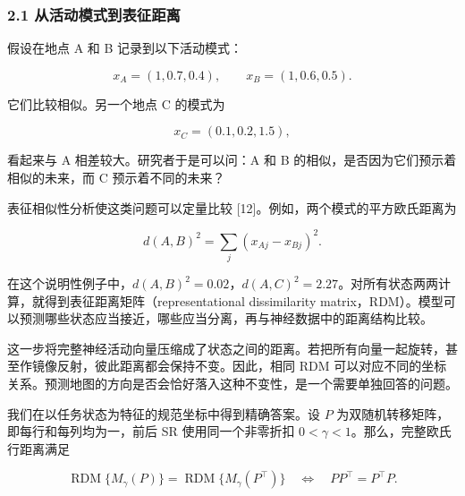 \documentclass[11pt,a4paper]{article}
\begin{document}
\subsubsection{2.1
从活动模式到表征距离}\label{ux4eceux6d3bux52a8ux6a21ux5f0fux5230ux8868ux5f81ux8dddux79bb}

\par
\noindent\begin{minipage}{\linewidth}

假设在地点 A 和 B 记录到以下活动模式：

\[
x_A=(1,0.7,0.4),\qquad x_B=(1,0.6,0.5).
\]

\end{minipage}\par

\par
\noindent\begin{minipage}{\linewidth}

它们比较相似。另一个地点 C 的模式为

\[
x_C=(0.1,0.2,1.5),
\]

\end{minipage}\par

看起来与 A 相差较大。研究者于是可以问：A 和 B
的相似，是否因为它们预示着相似的未来，而 C 预示着不同的未来？

\par
\noindent\begin{minipage}{\linewidth}

表征相似性分析使这类问题可以定量比较
{[}12{]}。例如，两个模式的平方欧氏距离为

\[
d(A,B)^2=\sum_j(x_{Aj}-x_{Bj})^2.
\]

\end{minipage}\par

在这个说明性例子中，\(d(A,B)^2=0.02\)，\(d(A,C)^2=2.27\)。对所有状态两两计算，就得到表征距离矩阵（representational
dissimilarity
matrix，RDM）。模型可以预测哪些状态应当接近，哪些应当分离，再与神经数据中的距离结构比较。

这一步将完整神经活动向量压缩成了状态之间的距离。若把所有向量一起旋转，甚至作镜像反射，彼此距离都会保持不变。因此，相同
RDM
可以对应不同的坐标关系。预测地图的方向是否会恰好落入这种不变性，是一个需要单独回答的问题。

\par
\noindent\begin{minipage}{\linewidth}

我们在以任务状态为特征的规范坐标中得到精确答案。设 \(P\)
为双随机转移矩阵，即每行和每列均为一，前后 SR 使用同一个非零折扣
\(0<\gamma<1\)。那么，完整欧氏行距离满足

\[
\operatorname{RDM}\{M_\gamma(P)\}
=\operatorname{RDM}\{M_\gamma(P^\top)\}
\quad\Longleftrightarrow\quad
PP^\top=P^\top P.
\]

\end{minipage}\par
\end{document}
